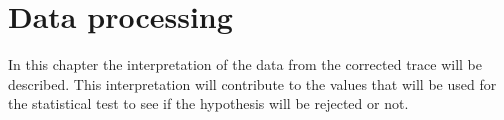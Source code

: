 \chapter{Data processing}
In this chapter the interpretation of the data from the corrected trace will be described. This interpretation will contribute to the values that will be used for the statistical test to see if the hypothesis will be rejected or not.  